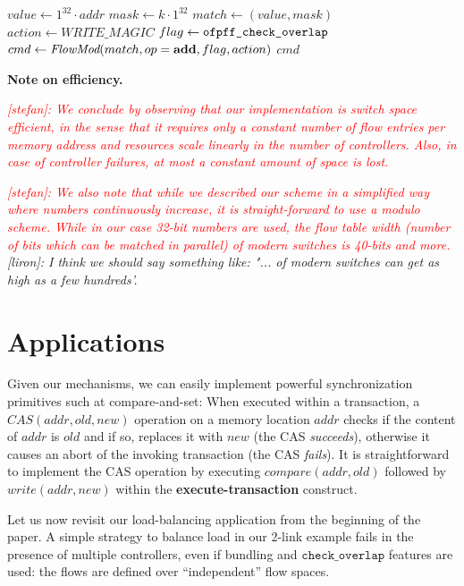 \documentclass[conference]{sigcomm-alternate}
\newcommand{\concat}[0]{\cdot}
\newcommand{\cas}{CAS\xspace}
\newcommand{\compare}{compare\xspace}
\newcommand{\memwrite}{write\xspace}
\newcommand{\addr}{\textit{addr}\xspace}
\newcommand{\add}{\textbf{add}\xspace}
\newcommand{\checko}{\texttt{check\_overlap}\xspace}
\newcommand{\stefan}[1]{\textit{\textcolor{red}{[stefan]: #1}}} %
\newcommand{\liron}[1]{\textit{\textcolor{mypurple}{[liron]: #1}}} %
\newcommand{\execatomic}{\textbf{execute-transaction}}
\newcommand{\true}{\textit{true}}
\newcommand{\false}{\textit{false}}
\newcommand{\ones}[1]{1^{#1}}
\newcommand{\memmagic}{\textit{WRITE\_MAGIC}}
\begin{document}
\begin{algorithm}[t]
    \caption{$\textit{\compare}(\addr,k)$}
    \label{alg:compare}
    \begin{algorithmic}[1]
    		\State $value \gets \ones{32}\concat\addr$
    		\State $mask \gets  k\concat\ones{32}$
    		\State $match \gets (value,mask)$
    		\State $action \gets \memmagic$
    		\State $flag \gets \texttt{ofpff\_\checko}$
    		\State $cmd\gets \emph{FlowMod}(match, op = \add, flag, action) $
			\Return $cmd$
    \end{algorithmic}
\end{algorithm}

\vspace{1mm}
\noindent\textbf{Note on efficiency.}

\stefan{We conclude by observing that our implementation is switch space efficient,
in the sense that it requires only a constant number of flow entries per memory address
and resources scale linearly in the number of controllers. Also, in case of controller failures,
at most a constant amount of space is lost.}

\stefan{We also note that while we described our scheme in a simplified
way where numbers continuously increase, it is straight-forward to use a modulo
scheme. While in our case 32-bit numbers are used, 
the flow table width (number of bits which can be matched in parallel)
of modern switches is 40-bits and more.}
 \liron{I think we should say something like: "... of modern switches can get as high as a few hundreds'. }
\section{Applications}\label{sec:apps}

Given our mechanisms, we can easily implement
powerful synchronization primitives such at compare-and-set:
When executed within a
transaction, a $\cas(\addr,\textit{old},\textit{new})$ operation 
on a memory location $\addr$
checks if the content of $\addr$ is $\textit{old}$ and if so,
replaces it with $\textit{new}$ %
(the CAS \emph{succeeds}), otherwise it 
causes an abort of the invoking transaction
(the CAS \emph{fails}).
It is straightforward to implement the CAS operation by executing
$\textit{\compare}(\addr, old)$ followed by $\textit{\memwrite}(\addr,
new)$ within the {\execatomic} construct.

Let us now revisit our load-balancing application
from the beginning of the paper.
A simple strategy to balance load in our 2-link example
 fails in the presence of
multiple controllers, even if 
bundling and $\checko$ features are used:
the flows are defined over ``independent'' 
flow spaces. 
\end{document}
